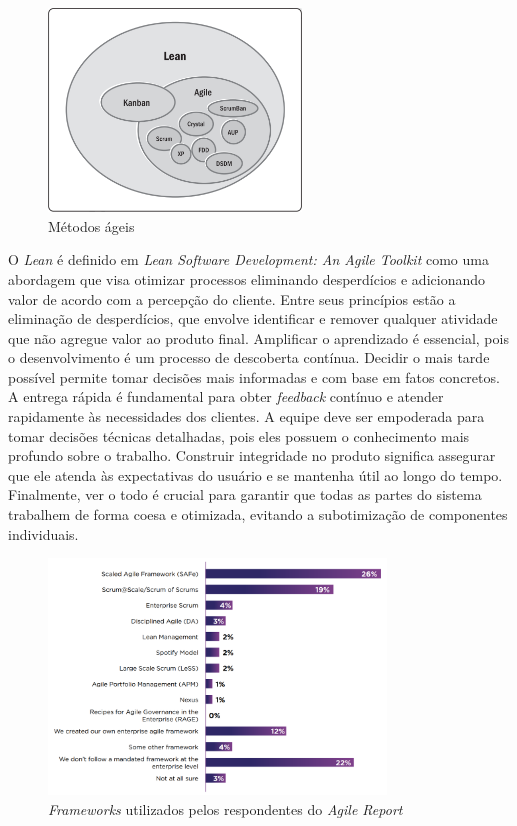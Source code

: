 \documentclass[
	12pt,
	openright,
	twoside,
	a4paper,
	english,
	brazil
	]{abntex2}
\begin{document}
\begin{figure}[H]
  \centering
	\caption{\label{metodos-ageis}Métodos ágeis}
  \includegraphics[width=0.6\textwidth]{metodos-ageis}
\end{figure}

O \textit{Lean} é definido em \textit{Lean Software Development: An Agile Toolkit} \cite{Poppendieck_Poppendieck_2003} como uma abordagem que visa otimizar processos eliminando desperdícios e adicionando valor de acordo com a percepção do cliente. Entre seus princípios estão a eliminação de desperdícios, que envolve identificar e remover qualquer atividade que não agregue valor ao produto final. Amplificar o aprendizado é essencial, pois o desenvolvimento é um processo de descoberta contínua. Decidir o mais tarde possível permite tomar decisões mais informadas e com base em fatos concretos. A entrega rápida é fundamental para obter \textit{feedback} contínuo e atender rapidamente às necessidades dos clientes. A equipe deve ser empoderada para tomar decisões técnicas detalhadas, pois eles possuem o conhecimento mais profundo sobre o trabalho. Construir integridade no produto significa assegurar que ele atenda às expectativas do usuário e se mantenha útil ao longo do tempo. Finalmente, ver o todo é crucial para garantir que todas as partes do sistema trabalhem de forma coesa e otimizada, evitando a subotimização de componentes individuais.

\begin{figure}[H]
  \centering
	\caption{\label{annual-agile-report}\textit{Frameworks} utilizados pelos respondentes do \textit{Agile Report}}
  \includegraphics[width=0.8\textwidth]{annual-agile-report}
\end{figure}
\end{document}
